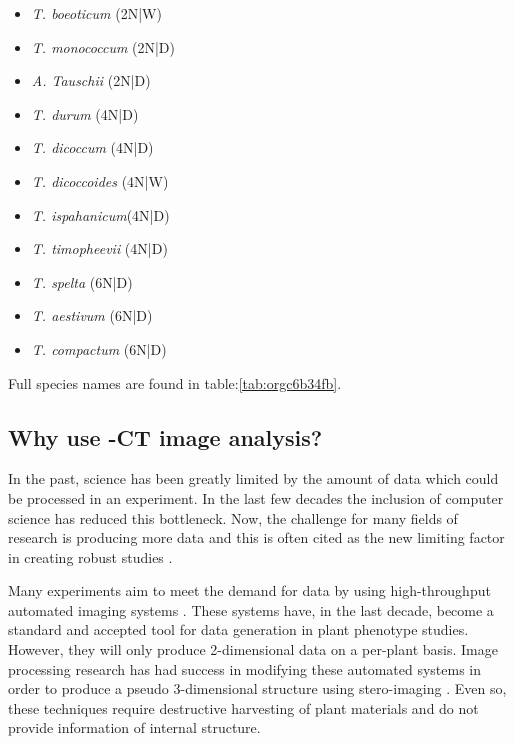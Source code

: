 \documentclass[11pt]{report}
\begin{document}
\begin{multicols}{3}

  \begin{itemize}
  \item{\textit{T. boeoticum} (2N|W)}
  \item{\textit{T. monococcum} (2N|D)}
  \item{\textit{A. Tauschii} (2N|D)}
  \end{itemize}

  \columnbreak

  \begin{itemize}
  \item{\textit{T. durum} (4N|D)}
  \item{\textit{T. dicoccum} (4N|D)}
  \item{\textit{T. dicoccoides} (4N|W)}
  \item{\textit{T. ispahanicum}(4N|D)}
  \item{\textit{T. timopheevii} (4N|D)}
  \end{itemize}

  \columnbreak

  \begin{itemize}
  \item{\textit{T. spelta} (6N|D)}
  \item{\textit{T. aestivum} (6N|D)}
  \item{\textit{T. compactum} (6N|D)}
  \end{itemize}

\end{multicols}
Full species names are found in table:\ref{tab:orgc6b34fb}.

\subsection{Why use \textmu{}-CT image analysis?}
\label{sec:org8834823}
In the past, science has been greatly limited by the amount of data which could be processed in an experiment. In the last few decades the inclusion of computer science has reduced this bottleneck. Now, the challenge for many fields of research is producing more data and this is often cited as the new limiting factor in creating robust studies \cite{Furbank2011}.

Many experiments aim to meet the demand for data by using high-throughput automated imaging systems \cite{Naumann2007,Prasanna2013,Humplik2015}. These systems have, in the last decade, become a standard and accepted tool for data generation in plant phenotype studies. However, they will only produce 2-dimensional data on a per-plant basis. Image processing research has had success in modifying these automated systems in order to produce a pseudo 3-dimensional structure using stero-imaging \cite{Roussel2016}. Even so, these techniques require destructive harvesting of plant materials and do not provide information of internal structure.
\end{document}
